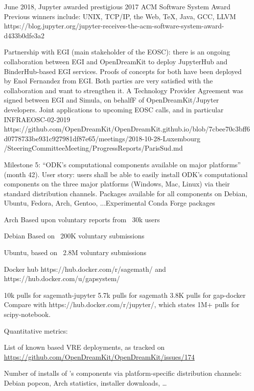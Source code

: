 \begin{Aim 1}
\begin{Aim 2}
\begin{itemize}
       June 2018, Jupyter awarded prestigious 2017 ACM Software System Award
       Previous winners include: UNIX, TCP/IP, the Web, TeX, Java, GCC, LLVM
       https://blog.jupyter.org/jupyter-receives-the-acm-software-system-award-d433b0dfe3a2
       
       
       Partnership with EGI (main stakeholder of the EOSC): there is an ongoing collaboration between EGI and OpenDreamKit to deploy
       JupyterHub and BinderHub-based EGI services. Proofs of concepts for both have been deployed by Enol Fernandez from EGI. Both parties
       are very satisfied with the collaboration and want to strengthen it. A Technology Provider Agreement was signed between EGI and
       Simula, on behalfF of OpenDreamKit/Jupyter developers. Joint applications to upcoming EOSC calls, and in particular INFRAEOSC-02-2019
       https://github.com/OpenDreamKit/OpenDreamKit.github.io/blob/7cbee70c3bff6d0778733be931c927981df87e65/meetings/2018-10-28-Luxembourg
       /SteeringCommitteeMeeting/ProgressReports/ParisSud.md
       
      
      Milestone 5: “ODK’s computational components available on major platforms” (month 42).
      User story: users shall be able to easily install ODK’s computational components on the three major platforms (Windows, Mac, Linux)
      via their standard distribution channels.
      Packages available for all components on Debian, Ubuntu, Fedora, Arch, Gentoo, ...Experimental Conda Forge packages
      
      Arch Based upon voluntary reports from ~30k users
      
      Debian Based on ~200K voluntary submissions
      
      Ubuntu, based on ~2.8M voluntary submissions
      
      Docker hub https://hub.docker.com/r/sagemath/ and https://hub.docker.com/u/gapsystem/

          10k pulls for sagemath-jupyter
          5.7k pulls for sagemath
          3.8K pulls for gap-docker
Compare with https://hub.docker.com/r/jupyter/, which states 1M+ pulls for scipy-notebook.
 
   
  Quantitative metrics:
\begin{description}
\item List of known \ODK based VRE deployments, as tracked on
  \url{https://github.com/OpenDreamKit/OpenDreamKit/issues/174}
\item Number of installs of \ODK's components via platform-specific
  distribution channels: Debian popcon, Arch statistics, installer
  downloads, \dots
\end{description}


\end{itemize}
\end{Aim 2}
\end{Aim 1}
